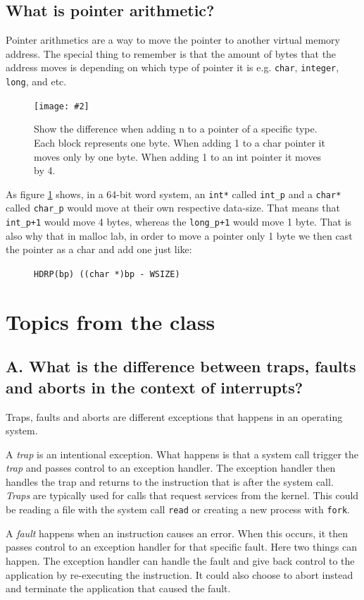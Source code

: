 \documentclass[11pt]{article}
\newcommand{\code}[1]{{\colorbox{lightgray!15}{\color{black}\texttt{#1}}}}
\newcommand{\centeredpic}[4][0.5]{
    \begin{figure}[h]
        \texttt{[image: \#2]}
        \centering
        \caption{#3}
        \label{fig:#4}
    \end{figure}
}
\begin{document}
\subsection{What is pointer arithmetic?}
Pointer arithmetics are a way to move the pointer to another virtual memory address. The special thing to remember is that the amount of bytes 
that the address moves is depending on which type of pointer it is e.g. \code{char}, \code{integer}, \code{long}, and etc.
\centeredpic{pointer arithmetic.png}{Show the difference when adding n to a pointer of a specific type. Each block represents one byte. When adding 1 to a char pointer it moves only by one byte. When adding 1 to an int pointer it moves by 4.}{pointer-arith}
As figure \ref{fig:pointer-arith} shows, in a 64-bit word system, an \code{int*} called \code{int\_p} and a \code{char*} called \code{char\_p} would move at their own respective data-size.
That means that \code{int\_p+1} would move 4 bytes, whereas the \code{long\_p+1} would move 1 byte.
That is also why that in malloc lab, in order to move a pointer only 1 byte we then cast the pointer as a char and add one just like: 
\begin{figure}
    \code{HDRP(bp) ((char *)bp - WSIZE)}
    \centering
\end{figure}

\section{Topics from the class}

\subsection{A. What is the difference between traps, faults and aborts in the context of interrupts?}
Traps, faults and aborts are different exceptions that happens in an operating system.

A \textit{trap} is an intentional exception. What happens is that a system call trigger the \textit{trap} and passes control 
to an exception handler. The exception handler then handles the trap and returns to the instruction that is after the system call.
\textit{Traps} are typically used for calls that request services from the kernel. This could be reading a file with the system call \code{read}
or creating a new process with \code{fork}.

A \textit{fault} happens when an instruction causes an error. When this occurs, it then passes control to an exception handler for that specific fault.
Here two things can happen. The exception handler can handle the fault and give back control to the application by re-executing the instruction. 
It could also choose to abort instead and terminate the application that caused the fault.
\end{document}
